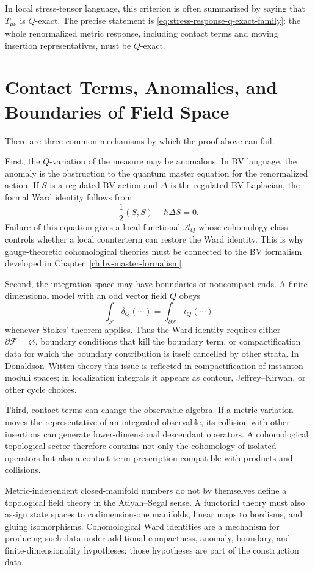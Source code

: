 In local stress-tensor language, this criterion is often summarized by saying
that \(T_{\mu\nu}\) is \(Q\)-exact.  The
precise statement is \eqref{eq:stress-response-q-exact-family}: the whole
renormalized metric response, including contact terms and moving insertion
representatives, must be \(Q\)-exact.

\section{Contact Terms, Anomalies, and Boundaries of Field Space}

There are three common mechanisms by which the proof above can fail.

First, the \(Q\)-variation of the measure may be anomalous.  In BV language,
the anomaly is the obstruction to the quantum master equation for the
renormalized action.  If \(S\) is a regulated BV action and \(\Delta\) is the
regulated BV Laplacian, the formal Ward identity follows from
\[
  \frac12(S,S)-\hbar\Delta S=0.
\]
Failure of this equation gives a local functional \(\mathcal A_Q\) whose
cohomology class controls whether a local counterterm can restore the Ward
identity.  This is why gauge-theoretic cohomological theories must be
connected to the BV formalism developed in
Chapter~\ref{ch:bv-master-formalism}.

Second, the integration space may have boundaries or noncompact ends.  A
finite-dimensional model with an odd vector field \(Q\) obeys
\[
  \int_{\mathcal F}\delta_Q(\cdots)=
  \int_{\partial\mathcal F}\iota_Q(\cdots)
\]
whenever Stokes' theorem applies.  Thus the Ward identity requires either
\(\partial\mathcal F=\varnothing\), boundary conditions that kill the
boundary term, or compactification data for which the boundary contribution
is itself cancelled by other strata.  In Donaldson--Witten theory this issue
is reflected in compactification of instanton moduli spaces; in
localization integrals it appears as contour, Jeffrey--Kirwan, or other
cycle choices.

Third, contact terms can change the observable algebra.  If a metric
variation moves the representative of an integrated observable, its
collision with other insertions can generate lower-dimensional descendant
operators.  A cohomological topological sector therefore contains not only
the cohomology of isolated operators but also a contact-term prescription
compatible with products and collisions.

\begin{warning}
\label{warn:metric-independence-not-functoriality}
Metric-independent closed-manifold numbers do not by themselves define a
topological field theory in the Atiyah--Segal sense.  A functorial theory
must also assign state spaces to codimension-one manifolds, linear maps to
bordisms, and gluing isomorphisms.  Cohomological Ward identities are a
mechanism for producing such data under additional compactness, anomaly,
boundary, and finite-dimensionality hypotheses; those hypotheses are part of
the construction data.
\end{warning}


